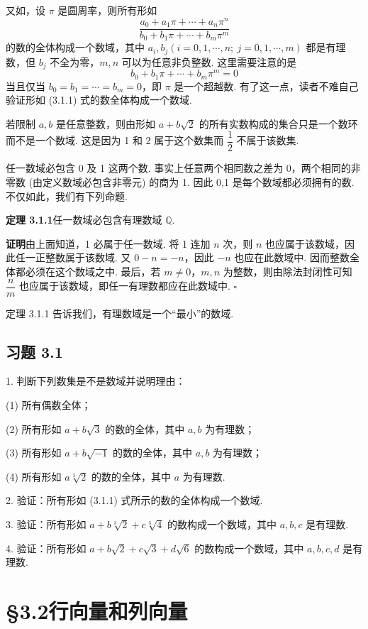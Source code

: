 \documentclass[UTF8, 12pt, fontset=fandol, oneside]{ctexart}
\begin{document}
又如，设 $\pi$ 是圆周率，则所有形如
\begin{equation}
\frac{a_0+a_1\pi+\cdots+a_n\pi^n}{b_0+b_1\pi+\cdots+b_m\pi^m}
\tag{3.1.1}
\end{equation}
的数的全体构成一个数域，其中 $a_i,b_j(i=0,1,\cdots,n;\ j=0,1,\cdots,m)$ 都是有理数，但 $b_j$ 不全为零，$m,n$ 可以为任意非负整数. 这里需要注意的是
\[
b_0+b_1\pi+\cdots+b_m\pi^m=0
\]
当且仅当 $b_0=b_1=\cdots=b_m=0$，即 $\pi$ 是一个超越数. 有了这一点，读者不难自己验证形如 (3.1.1) 式的数全体构成一个数域.

若限制 $a,b$ 是任意整数，则由形如 $a+b\sqrt{2}$ 的所有实数构成的集合只是一个数环而不是一个数域. 这是因为 1 和 2 属于这个数集而 $\dfrac{1}{2}$ 不属于该数集.

任一数域必包含 0 及 1 这两个数. 事实上任意两个相同数之差为 0，两个相同的非零数 (由定义数域必包含非零元) 的商为 1. 因此 0,1 是每个数域都必须拥有的数. 不仅如此，我们有下列命题.

\noindent\textbf{定理 3.1.1}\quad 任一数域必包含有理数域 $\mathbb{Q}$.

\noindent\textbf{证明}\quad 由上面知道，1 必属于任一数域. 将 1 连加 $n$ 次，则 $n$ 也应属于该数域，因此任一正整数属于该数域. 又 $0-n=-n$，因此 $-n$ 也应在此数域中. 因而整数全体都必须在这个数域之中. 最后，若 $m\neq 0$，$m,n$ 为整数，则由除法封闭性可知 $\dfrac{n}{m}$ 也应属于该数域，即任一有理数都应在此数域中. $\square$

定理 3.1.1 告诉我们，有理数域是一个“最小”的数域.

\subsection*{习题 3.1}

1. 判断下列数集是不是数域并说明理由：

(1) 所有偶数全体；

(2) 所有形如 $a+b\sqrt{3}$ 的数的全体，其中 $a,b$ 为有理数；

(3) 所有形如 $a+b\sqrt{-1}$ 的数的全体，其中 $a,b$ 为有理数；

(4) 所有形如 $a\sqrt[3]{2}$ 的数的全体，其中 $a$ 为有理数.

2. 验证：所有形如 (3.1.1) 式所示的数的全体构成一个数域.

3. 验证：所有形如 $a+b\sqrt[3]{2}+c\sqrt[3]{4}$ 的数构成一个数域，其中 $a,b,c$ 是有理数.

4. 验证：所有形如 $a+b\sqrt{2}+c\sqrt{3}+d\sqrt{6}$ 的数构成一个数域，其中 $a,b,c,d$ 是有理数.

\section*{§3.2\quad 行向量和列向量}
\end{document}
